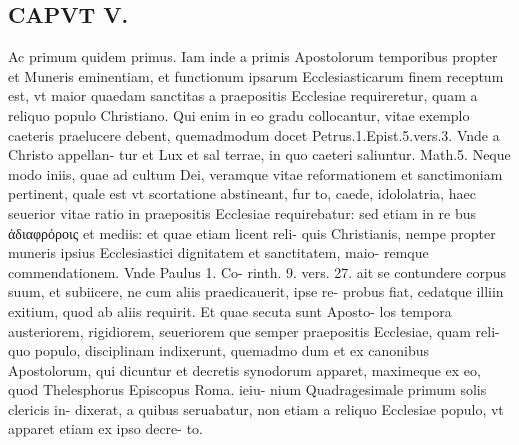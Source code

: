 \documentclass{article}
\begin{document}
\begin{pages}
\section*{CAPVT V. }
\marginpar{[ p.37 ]}\pstart Ac primum quidem primus. Iam inde a primis Apostolorum temporibus propter et Muneris eminentiam, et functionum ipsarum Ecclesiasticarum finem receptum est, vt maior quaedam sanctitas a praepositis Ecclesiae requireretur, quam a reliquo populo Christiano. Qui enim in eo gradu collocantur, vitae exemplo caeteris praelucere debent, quemadmodum docet Petrus.1.Epist.5.vers.3. Vnde a Christo appellan- tur et Lux et sal terrae, in quo caeteri saliuntur. Math.5. Neque modo iniis, quae ad cultum Dei, veramque vitae reformationem et sanctimoniam pertinent, quale est vt scortatione abstineant, fur to, caede, idololatria, haec seuerior vitae ratio in praepositis Ecclesiae requirebatur: sed etiam in re bus ἀδιαφρόροις et mediis: et quae etiam licent reli- quis Christianis, nempe propter muneris ipsius Ecclesiastici dignitatem et sanctitatem, maio- remque commendationem. Vnde Paulus 1. Co- rinth. 9. vers. 27. ait se contundere corpus suum, et subiicere, ne cum aliis praedicauerit, ipse re- probus fiat, cedatque illiin exitium, quod ab aliis requirit. Et quae secuta sunt Aposto- los tempora austeriorem, rigidiorem, seueriorem que semper praepositis Ecclesiae, quam reli- quo populo, disciplinam indixerunt, quemadmo dum et ex canonibus Apostolorum, qui dicuntur et decretis synodorum apparet, maximeque ex eo, quod Thelesphorus Episcopus Roma. ieiu- nium Quadragesimale primum solis clericis in- dixerat, a quibus seruabatur, non etiam a reliquo Ecclesiae populo, vt apparet etiam ex ipso decre- to.  \pend

\end{pages}
\end{document}
